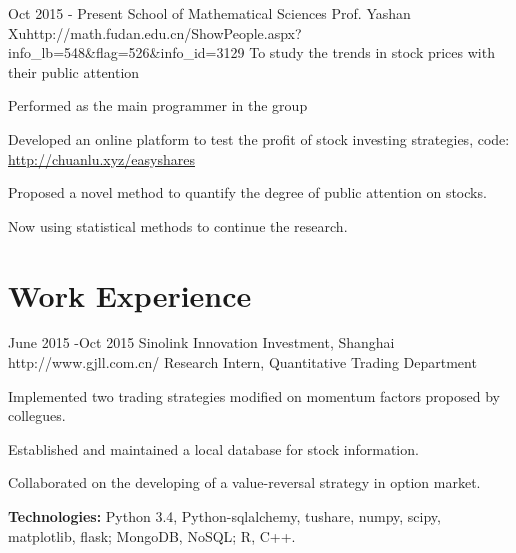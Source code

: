\documentclass[10pt]{article} %
\begin{document}
\research
{Oct 2015 - }{Present}
{School of Mathematical Sciences}
{Prof. Yashan Xu}{http://math.fudan.edu.cn/ShowPeople.aspx?info_lb=548&flag=526&info_id=3129}
{To study the trends in stock prices with their public attention}
{
\begin{itemize-noindent} \itemsep -2pt
\item{Performed as the main programmer in the group}
\item{Developed an online platform to test the profit of stock investing strategies, code:\\\href{http://chuanlu.xyz/easyshares}{http://chuanlu.xyz/easyshares}}
\item{Proposed a novel method to quantify the degree of public attention on stocks.}
\item{Now using statistical methods to continue the research.}
\end{itemize-noindent}
}

\section{Work Experience}

\job
{June 2015 -}{Oct 2015}
{Sinolink Innovation Investment, Shanghai}
{http://www.gjll.com.cn/}
{Research Intern, Quantitative Trading Department}
{\begin{itemize-noindent} \itemsep -2pt
\item{Implemented two trading strategies modified on momentum factors proposed by collegues.}
\item{Established and maintained a local database for stock information.}
\item{Collaborated on the developing of a value-reversal strategy in option market.}
\end{itemize-noindent}
\rule{0mm}{3mm}\textbf{Technologies:} Python 3.4, Python-sqlalchemy, tushare, numpy, scipy, matplotlib, flask; MongoDB, NoSQL; R, C++.}


\end{document}
